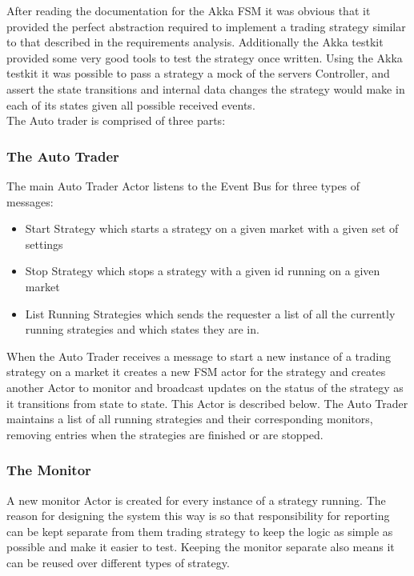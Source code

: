 		 After reading the documentation for the Akka FSM\cite{akkaFSM} it was obvious that it provided the perfect abstraction required to implement a trading strategy similar to that described in the requirements analysis. Additionally the Akka testkit provided some very good tools to test the strategy once written\cite{AkkaFSMTesting}. Using the Akka testkit it was possible to pass a strategy a mock of the servers Controller, and assert the state transitions and internal data changes the strategy would make in each of its states given all possible received events.\\
		
		The Auto trader 	is comprised of three parts:
		
		\subsubsection{The Auto Trader}
			The main Auto Trader Actor listens to the Event Bus for three types of messages:
			
				\begin{itemize}
					\item Start Strategy which starts a strategy on a given market with a given set of settings
					\item Stop Strategy which stops a strategy with a given id running on a given market
					\item List Running Strategies which sends the requester a list of all the currently running strategies and which states they are in.
				\end{itemize}
				
			When the Auto Trader receives a message to start a new instance of a trading strategy on a market it creates a new FSM actor for the strategy and creates another Actor to monitor and broadcast updates on the status of the strategy as it transitions from state to state. This Actor is described below. The Auto Trader maintains a list of all running strategies and their corresponding monitors, removing entries when the strategies are finished or are stopped.
			
		\subsubsection{The Monitor}
			A new monitor Actor is created for every instance of a strategy running. The reason for designing the system this way is so that responsibility for reporting can be kept separate from them trading strategy to keep the logic as simple as possible and make it easier to test. Keeping the monitor separate also means it can be reused over different types of strategy.\\
			
